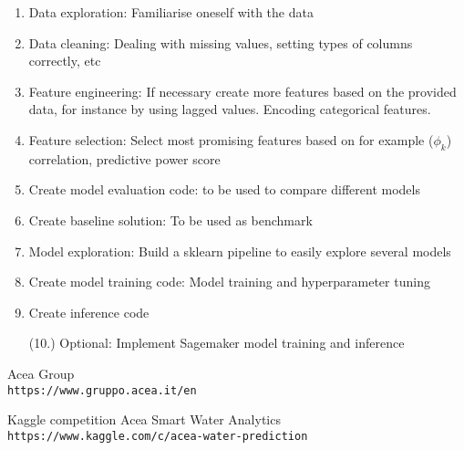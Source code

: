 \documentclass[11pt]{article}
\begin{document}
\begin{enumerate}
\item Data exploration: Familiarise oneself with the data
\item Data cleaning: Dealing with missing values, setting types of columns correctly, etc
\item Feature engineering: If necessary create more features based on the provided data, for instance by using lagged values. Encoding categorical features.
\item Feature selection: Select most promising features based on for example ($\phi_k$) correlation, predictive power score
\item Create model evaluation code: to be used to compare different models
\item Create baseline solution: To be used as benchmark
\item Model exploration: Build a sklearn pipeline to easily explore several models
\item Create model training code: Model training and hyperparameter tuning 
\item Create inference code
\item [(10.)] Optional: Implement Sagemaker model training and inference
\end{enumerate}

\begin{thebibliography}{9}

Acea Group \\\texttt{https://www.gruppo.acea.it/en}

Kaggle competition Acea Smart Water Analytics \\\texttt{https://www.kaggle.com/c/acea-water-prediction}

\end{thebibliography}
\end{document}
